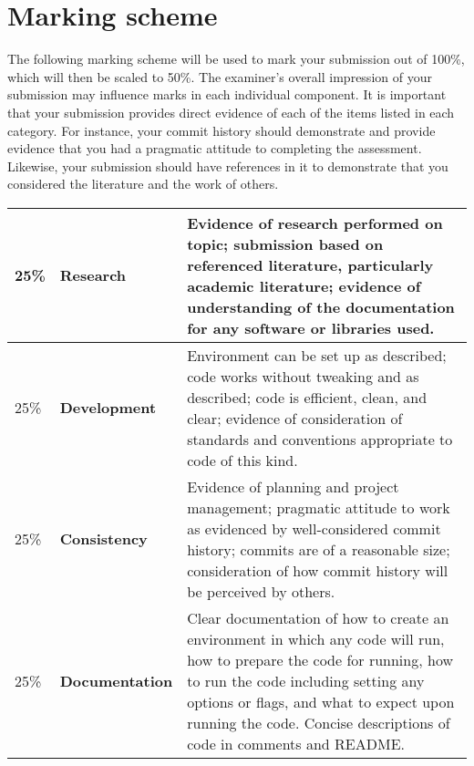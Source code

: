 \documentclass[a4paper, 12pt]{scrartcl}
\begin{document}
  \newpage

  \section*{Marking scheme}
    The following marking scheme will be used to mark your submission out of 100\%, which will then be scaled to 50\%.
    The examiner's overall impression of your submission may influence marks in each individual component.
    It is important that your submission provides direct evidence of each of the items listed in each category.
    For instance, your commit history should demonstrate and provide evidence that you had a pragmatic attitude to completing the assessment.
    Likewise, your submission should have references in it to demonstrate that you considered the literature and the work of others.
  
    \begin{center}
      \begin{tabular}{llp{8.4cm}}
        \toprule
        25\% & \textbf{Research} & Evidence of research performed on topic; submission based on referenced literature, particularly academic literature; evidence of understanding of the documentation for any software or libraries used. \\
        \midrule
        25\% & \textbf{Development} & Environment can be set up as described; code works without tweaking and as described; code is efficient, clean, and clear; evidence of consideration of standards and conventions appropriate to code of this kind. \\
        \midrule
        25\% & \textbf{Consistency} & Evidence of planning and project management; pragmatic attitude to work as evidenced by well-considered commit history; commits are of a reasonable size; consideration of how commit history will be perceived by others. \\
        \midrule
        25\% & \textbf{Documentation} & Clear documentation of how to create an environment in which any code will run, how to prepare the code for running, how to run the code including setting any options or flags, and what to expect upon running the code. Concise descriptions of code in comments and README. \\
        \bottomrule
      \end{tabular}
    \end{center}
    
  
  
  
\end{document}
